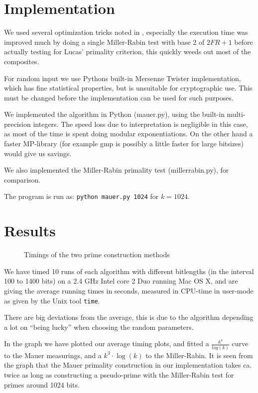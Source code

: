 \documentclass[11pt,a4paper]{article}
\begin{document}
\section{Implementation}

We used several optimization tricks noted in \cite{Menezes:1997:HAC}, especially the
execution time was improved much by doing a single Miller-Rabin test
with base 2 of $2FR+1$ before actually testing for Lucas' primality
criterion, this quickly weeds out most of the composites.

For random input we use Pythons built-in Mersenne Twister
implementation, which has fine statistical properties, but is
unsuitable for cryptographic use. This must be changed before the
implementation can be used for such purposes.

We implemented the algorithm in Python (mauer.py), using the built-in
multi-precision integers.  The speed loss due to interpretation is
negligible in this case, as most of the time is spent doing modular
exponentiations. On the other hand a faster MP-library (for example
gmp is possibly a little faster for large bitsizes) would give us
savings.

We also implemented the Miller-Rabin primality test (millerrabin.py),
for comparison.

The program is run as: \verb|python mauer.py 1024| for $k=1024$.

\section{Results}
\begin{figure}[h]
  \centering
  \caption{Timings of the two prime construction methods}
  \label{fig:timings}
\end{figure}

We have timed 10 runs of each algorithm with different bitlengths (in
the interval 100 to 1400 bits) on a 2.4 GHz Intel core 2 Duo running
Mac OS X, and are giving the average running times in seconds,
measured in CPU-time in user-mode as given by the Unix tool
\verb|time|. 

There are big deviations from the average, this is due to the
algorithm depending a lot on ``being lucky'' when choosing the random
parameters.

In the graph we have plotted our average timing plots, and fitted a
$\frac{k^4}{log(k)}$ curve to the Mauer measurings, and a
$k^3\cdot\log(k)$ to the Miller-Rabin.  It is seen from the graph that the Mauer
primality construction in our implementation takes ca. twice as long
as constructing a pseudo-prime with the Miller-Rabin test for primes
around 1024 bits.
\end{document}
